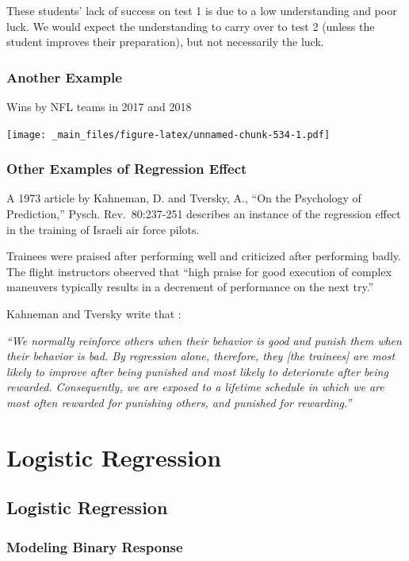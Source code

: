 \documentclass[]{book}
\begin{document}
These students' lack of success on test 1 is due to a low understanding
and poor luck. We would expect the understanding to carry over to test 2
(unless the student improves their preparation), but not necessarily the
luck.

\subsection{Another Example}\label{another-example}

Wins by NFL teams in 2017 and 2018

\texttt{[image: \_main\_files/figure-latex/unnamed-chunk-534-1.pdf]}

\subsection{Other Examples of Regression
Effect}\label{other-examples-of-regression-effect}

A 1973 article by Kahneman, D. and Tversky, A., ``On the Psychology of
Prediction,'' Pysch. Rev.~80:237-251 describes an instance of the
regression effect in the training of Israeli air force pilots.

Trainees were praised after performing well and criticized after
performing badly. The flight instructors observed that ``high praise for
good execution of complex maneuvers typically results in a decrement of
performance on the next try.''

Kahneman and Tversky write that :

\emph{``We normally reinforce others when their behavior is good and
punish them when their behavior is bad. By regression alone, therefore,
they {[}the trainees{]} are most likely to improve after being punished
and most likely to deteriorate after being rewarded. Consequently, we
are exposed to a lifetime schedule in which we are most often rewarded
for punishing others, and punished for rewarding.''}

\chapter{Logistic Regression}\label{logistic-regression}

\section{Logistic Regression}\label{logistic-regression-1}

\subsection{Modeling Binary Response}\label{modeling-binary-response}
\end{document}
